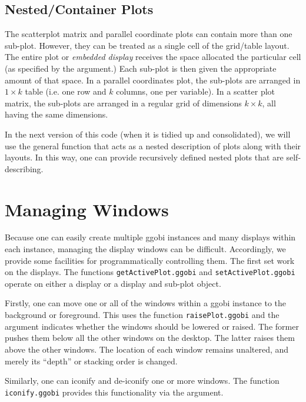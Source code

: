 \documentclass{article}
\def\SFunction#1{{\texttt{\red #1}}}
\begin{document}
\subsection{Nested/Container Plots}
The scatterplot matrix and parallel coordinate plots can contain more
than one sub-plot.  However, they can be treated as a single cell of
the grid/table layout. The entire plot or \textit{embedded display}
receives the space allocated the particular cell (as specified by the
 argument.)  Each sub-plot is then given the appropriate
amount of that space.  In a parallel coordinates plot, the sub-plots
are arranged in $1 \times k$ table (i.e. one row and $k$ columns, one
per variable).  In a scatter plot matrix, the sub-plots are arranged
in a regular grid of dimensions $k \times k$, all having the same
dimensions.

In the next version of this code (when it is tidied up and
consolidated), we will use the general  function
that acts as a nested description of plots along with their layouts.
In this way, one can provide recursively defined nested plots that are
self-describing.





\section{Managing Windows}
Because one can easily create multiple ggobi instances and many
displays within each instance, managing the display windows can be
difficult. Accordingly, we provide some facilities for
programmatically controlling them.  The first set work on the
displays.  The functions \SFunction{getActivePlot.ggobi} and
\SFunction{setActivePlot.ggobi} operate on either a display or a
display and sub-plot object.

Firstly, one can move one or all of the windows within a ggobi
instance to the background or foreground.  This uses the function
\SFunction{raisePlot.ggobi} and the argument  indicates
whether the windows should be lowered or raised.  The former pushes
them below all the other windows on the desktop.  The latter raises
them above the other windows. The location of each window remains
unaltered, and merely its ``depth'' or stacking order is changed.

Similarly, one can iconify and de-iconify one or more windows.  The
function \SFunction{iconify.ggobi} provides this functionality via the
 argument.
\end{document}
